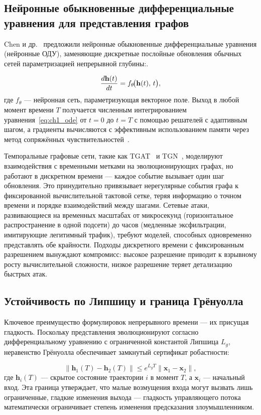 \subsection{Нейронные обыкновенные дифференциальные уравнения для представления графов}

Chen и др.~\cite{Chen2018} предложили нейронные обыкновенные дифференциальные уравнения (нейронные ОДУ), заменяющие дискретные послойные обновления обычных сетей параметризацией непрерывной глубины:.

\begin{equation}
\frac{d\mathbf{h}(t)}{dt} = f_\theta\!\bigl(\mathbf{h}(t),\, t\bigr),
\label{eq:ch1_ode}
\end{equation}где $f_\theta$ --- нейронная сеть, параметризующая векторное поле. Выход в любой момент времени $T$ получается численным интегрированием уравнения~\eqref{eq:ch1_ode} от $t=0$ до $t=T$ с помощью решателей с адаптивным шагом, а градиенты вычисляются с эффективным использованием памяти через метод сопряжённых чувствительностей~\cite{Pontryagin1962}.

Темпоральные графовые сети, такие как TGAT~\cite{Xu2020tgat} и TGN~\cite{Rossi2020}, моделируют взаимодействия с временными метками на эволюционирующих графах, но работают в дискретном времени --- каждое событие вызывает один шаг обновления. Это принудительно привязывает нерегулярные события графа к фиксированной вычислительной тактовой сетке, теряя информацию о точном времени и порядке взаимодействий между шагами. Сетевые атаки, развивающиеся на временных масштабах от микросекунд (горизонтальное распространение в одной подсети) до часов (медленные эксфильтрации, имитирующие легитимный трафик), требуют моделей, способных одновременно представлять обе крайности. Подходы дискретного времени с фиксированным разрешением вынуждают компромисс: высокое разрешение приводит к взрывному росту вычислительной сложности, низкое разрешение теряет детализацию быстрых атак.

\subsection{Устойчивость по Липшицу и граница Грёнуолла}

Ключевое преимущество формулировок непрерывного времени --- их присущая гладкость. Поскольку представления эволюционируют согласно дифференциальному уравнению с ограниченной константой Липшица $L_g$, неравенство Грёнуолла обеспечивает замкнутый сертификат робастности:

\begin{equation}
\|\mathbf{h}_1(T) - \mathbf{h}_2(T)\| \leq e^{L_g T}\|\mathbf{x}_1 - \mathbf{x}_2\|,
\label{eq:ch1_gronwall}
\end{equation}где $\mathbf{h}_i(T)$ --- скрытое состояние траектории $i$ в момент $T$, а $\mathbf{x}_i$ --- начальный вход. Эта граница утверждает, что малые возмущения входа могут вызвать лишь ограниченные, гладкие изменения выхода --- гладкость управляющего потока математически ограничивает степень изменения предсказания злоумышленником.

